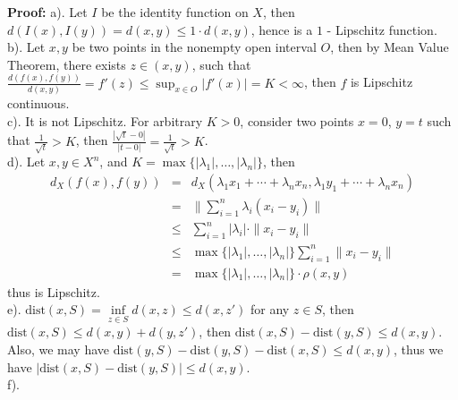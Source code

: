 \documentclass[12pt]{article}
\begin{document}
\textbf{Proof:} a). Let $I$ be the identity function on $X$, then $d(I(x), I(y))=d(x,y)\leq 1\cdot d(x,y)$, hence is a $1$ - Lipschitz function.  \\
\indent b). Let $x, y$ be two points in the nonempty open interval $O$, then by Mean Value Theorem, there exists $z\in (x, y)$, such that $\frac{d(f(x), f(y))}{d(x, y)}=f'(z)\leq \sup_{x\in O}|f'(x)|=K<\infty$, then $f$ is Lipschitz continuous.  \\
\indent c). It is not Lipschitz. For arbitrary $K>0$, consider two points $x=0$, $y=t$ such that $\frac{1}{\sqrt{t}}>K$, then $\frac{|\sqrt{t}-0|}{|t-0|}=\frac{1}{\sqrt{t}}>K$.  \\
\indent d). Let $x,y\in X^{n}$, and $K = \max\{|\lambda_{1}|, \dots, |\lambda_{n}|\}$, then 
\begin{eqnarray*}
d_{X}(f(x),f(y))&=&d_{X}(\lambda_{1}x_{1}+\cdots+\lambda_{n}x_{n},\lambda_{1}y_{1}+\cdots+\lambda_{n}x_{n}) \\
&=&\|\sum\limits_{i=1}^{n}\lambda_{i}(x_{i}-y_{i})\| \\
&\leq& \sum\limits_{i=1}^{n}|\lambda_{i}|\cdot \|x_{i}-y_{i}\| \\
&\leq& \max\{|\lambda_{1}|, \dots, |\lambda_{n}|\}\sum\limits_{i=1}^{n}\|x_{i}-y_{i}\| \\
&=& \max\{|\lambda_{1}|, \dots, |\lambda_{n}|\}\cdot\rho(x,y)
\end{eqnarray*} thus is Lipschitz. \\
\indent e). $\text{dist}(x, S)=\inf\limits_{z\in S}d(x, z)\leq d(x, z')$ for any $z\in S$, then $\text{dist}(x, S)\leq d(x, y)+d(y, z')$, then $\text{dist}(x, S)-\text{dist}(y, S)\leq d(x, y)$. Also, we may have $\text{dist}(y, S)-\text{dist}(y, S)-\text{dist}(x, S)\leq d(x,y)$, thus we have $|\text{dist}(x, S)-\text{dist}(y,S)|\leq d(x, y)$. \\
\indent f). 
\end{document}

